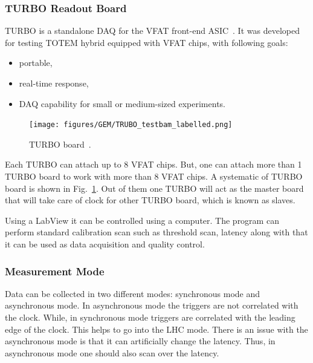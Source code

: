 
\subsubsection{TURBO Readout Board} %
\label{ssub:turbo_readout_board}
TURBO is a standalone DAQ for the VFAT front-end ASIC~\cite{Paschalis2011}. It was developed for testing TOTEM hybrid equipped with VFAT chips, with following goals:
\begin{itemize}
    \item portable,
    \item real-time response,
    \item DAQ capability for small or medium-sized experiments.
\end{itemize}
\begin{figure}[htbp]
    \centering
    \texttt{[image: figures/GEM/TRUBO\_testbam\_labelled.png]}
    \caption{TURBO board~\cite{Paschalis2011}.}
    \label{fig:turbo}
\end{figure}
Each TURBO can attach up to 8 VFAT chips. 
But, one can attach more than 1 TURBO board to work with more than 8 VFAT chips. 
A systematic of TURBO board is shown in Fig.~\ref{fig:turbo}. 
Out of them one TURBO will act as the master board that will take care of clock for other TURBO board, which is known as slaves.

Using a LabView it can be controlled using a computer. 
The program can perform standard calibration scan such as threshold scan, latency along with that it can be used as data acquisition and quality control.


\subsubsection{Measurement Mode} %
\label{ssub:measurement_mode}
Data can be collected in two different modes: synchronous mode and asynchronous mode. In asynchronous mode the triggers are not correlated with the clock. While, in synchronous mode triggers are correlated with the leading edge of the clock. This helps to go into the LHC mode. There is an issue with the asynchronous mode is that it can artificially change the latency. Thus, in asynchronous mode one should also scan over the latency.

